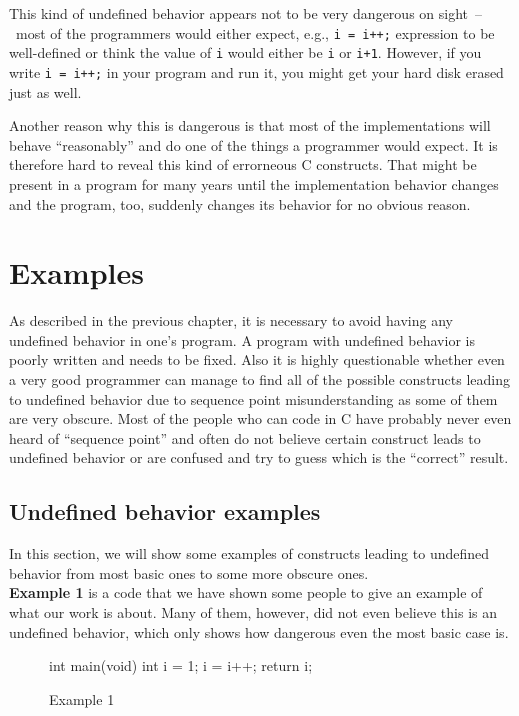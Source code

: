 This kind of undefined behavior appears not to be very dangerous on sight~--~most of the programmers would either expect, e.g., \verb|i = i++;| expression to be well-defined or think the value of \verb|i| would either be \verb|i| or \verb|i+1|.
However, if you write \verb|i = i++;| in your program and run it, you might get your hard disk erased just as well.

Another reason why this is dangerous is that most of the implementations will behave ``reasonably'' and do one of the things a programmer would expect. It is therefore hard to reveal this kind of errorneous C constructs. That might be present in a program for many years until the implementation behavior changes and the program, too, suddenly changes its behavior for no obvious reason.

\chapter{Examples}
As described in the previous chapter, it is necessary to avoid having any undefined behavior in one's program. A program with undefined behavior is poorly written and needs to be fixed. Also it is highly questionable whether even a very good programmer can manage to find all of the possible constructs leading to undefined behavior due to sequence point misunderstanding as some of them are very obscure. Most of the people who can code in C have probably never even heard of ``sequence point'' and often do not believe certain construct leads to undefined behavior or are confused and try to guess which is the ``correct'' result.

\section{Undefined behavior examples}
In this section, we will show some examples of constructs leading to undefined behavior from most basic ones to some more obscure ones.
\\

\textbf{Example 1} is a code that we have shown some people to give an example of what our work is about. Many of them, however, did not even believe this is an undefined behavior, which only shows how dangerous even the most basic case is.
\begin{figure}[h!]
\caption{Example 1}
\begin{code}
int main(void){
	int i = 1;
	i = i++;
	return i;
}
\end{code}
\end{figure}

